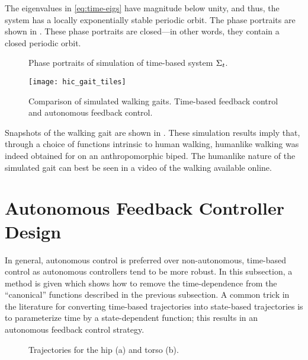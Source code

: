 The eigenvalues in \eqref{eq:time-eigs} have magnitude below unity, and thus,
the system has a locally exponentially stable periodic orbit.
%
The phase portraits are shown in .
%
These phase portraits are closed---in other words, they contain a closed
periodic orbit.
%
\begin{figure*}[t!]
  \centering
  \caption{Phase portraits of simulation of time-based system $\Sigma_t$.}
  \label{fig:pp-t}
\end{figure*}
%
\begin{figure}[t!]
  \centering
  \texttt{[image: hic\_gait\_tiles]}
  \caption[Comparison of simulated walking gaits.]{Comparison of simulated
    walking gaits. Time-based feedback control and autonomous feedback
    control.}
  \label{fig:gaittiles}
\end{figure}
%
Snapshots of the walking gait are shown in .
%
These simulation results imply that, through a choice of functions intrinsic to
human walking, humanlike walking was indeed obtained for on an anthropomorphic
biped.
%
The humanlike nature of the simulated gait can best be seen in a video of the
walking available online.


\section{Autonomous Feedback Controller Design}

In general, autonomous control is preferred over non-autonomous, time-based
control as autonomous controllers tend to be more robust.
%
In this subsection, a method is given which shows how to remove the
time-dependence from the ``canonical'' functions described in the previous
subsection.
%
A common trick in the literature \cite{Westervelt2007} for converting time-based
trajectories into state-based trajectories is to parameterize time by a
state-dependent function;
%
this results in an autonomous feedback control strategy.

\begin{figure}[t]
  \centering
  \caption{Trajectories for the hip (a) and torso (b).}
  \label{fig:torso-hip}
\end{figure}


